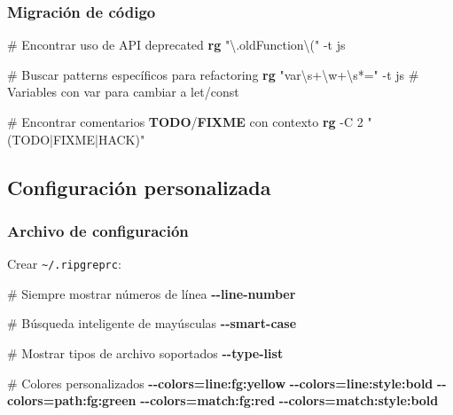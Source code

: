 \documentclass[
  11pt,
  letterpaper,
  oneside,
  openany]{scrbook}
\newenvironment{Shaded}{}{}
\newcommand{\AlertTok}[1]{\textcolor[rgb]{1.00,0.33,0.33}{\textbf{#1}}}
\newcommand{\AttributeTok}[1]{\textcolor[rgb]{0.84,0.23,0.29}{#1}}
\newcommand{\CommentTok}[1]{\textcolor[rgb]{0.42,0.45,0.49}{#1}}
\newcommand{\ExtensionTok}[1]{\textcolor[rgb]{0.84,0.23,0.29}{\textbf{#1}}}
\newcommand{\NormalTok}[1]{\textcolor[rgb]{0.14,0.16,0.18}{#1}}
\newcommand{\StringTok}[1]{\textcolor[rgb]{0.01,0.18,0.38}{#1}}
\begin{document}
\subsubsection{Migración de código}\label{migraciuxf3n-de-cuxf3digo}

\begin{Shaded}
\begin{Highlighting}[]
\CommentTok{\# Encontrar uso de API deprecated}
\ExtensionTok{rg} \StringTok{"\textbackslash{}.oldFunction\textbackslash{}("} \AttributeTok{{-}t}\NormalTok{ js}

\CommentTok{\# Buscar patterns específicos para refactoring}
\ExtensionTok{rg} \StringTok{"var\textbackslash{}s+\textbackslash{}w+\textbackslash{}s*="} \AttributeTok{{-}t}\NormalTok{ js  }\CommentTok{\# Variables con \textquotesingle{}var\textquotesingle{} para cambiar a \textquotesingle{}let/const\textquotesingle{}}

\CommentTok{\# Encontrar comentarios }\AlertTok{TODO}\CommentTok{/}\AlertTok{FIXME}\CommentTok{ con contexto}
\ExtensionTok{rg} \AttributeTok{{-}C}\NormalTok{ 2 }\StringTok{"(TODO|FIXME|HACK)"}
\end{Highlighting}
\end{Shaded}

\subsection{Configuración
personalizada}\label{configuraciuxf3n-personalizada}

\subsubsection{Archivo de
configuración}\label{archivo-de-configuraciuxf3n-1}

Crear \texttt{\textasciitilde{}/.ripgreprc}:

\begin{Shaded}
\begin{Highlighting}[]
\CommentTok{\# Siempre mostrar números de línea}
\ExtensionTok{{-}{-}line{-}number}

\CommentTok{\# Búsqueda inteligente de mayúsculas}
\ExtensionTok{{-}{-}smart{-}case}

\CommentTok{\# Mostrar tipos de archivo soportados}
\ExtensionTok{{-}{-}type{-}list}

\CommentTok{\# Colores personalizados}
\ExtensionTok{{-}{-}colors=line:fg:yellow}
\ExtensionTok{{-}{-}colors=line:style:bold}
\ExtensionTok{{-}{-}colors=path:fg:green}
\ExtensionTok{{-}{-}colors=match:fg:red}
\ExtensionTok{{-}{-}colors=match:style:bold}
\end{Highlighting}
\end{Shaded}
\end{document}
